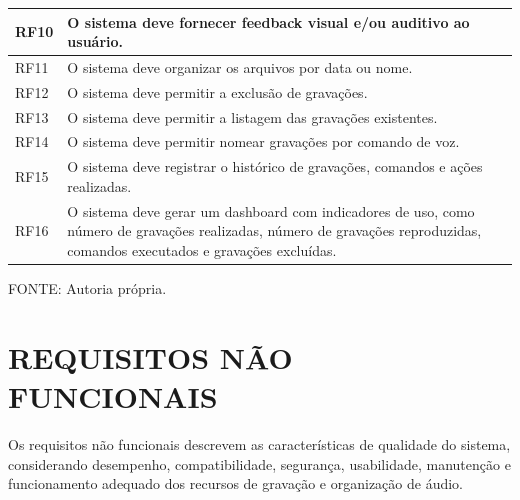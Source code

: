 \documentclass[12pt,oneside,a4paper,brazil,final]{abntex2}
\newcommand{\fontetabela}[1]{%
    \begin{center}
    {\fontsize{10}{12}\selectfont FONTE: #1}
    \end{center}
}
\begin{document}
\begin{longtable}{|p{2.3cm}|p{12cm}|}
\hline

RF10 & O sistema deve fornecer feedback visual e/ou auditivo ao usuário. \\

\hline

RF11 & O sistema deve organizar os arquivos por data ou nome. \\

\hline

RF12 & O sistema deve permitir a exclusão de gravações. \\

\hline

RF13 & O sistema deve permitir a listagem das gravações existentes. \\

\hline

RF14 & O sistema deve permitir nomear gravações por comando de voz. \\

\hline

RF15 & O sistema deve registrar o histórico de gravações, comandos e ações realizadas. \\

\hline

RF16 & O sistema deve gerar um dashboard com indicadores de uso, como número de gravações realizadas, número de gravações reproduzidas, comandos executados e gravações excluídas. \\

\hline

\end{longtable}

\fontetabela{Autoria própria.}



\section{REQUISITOS NÃO FUNCIONAIS}



Os requisitos não funcionais descrevem as características de qualidade do sistema, considerando desempenho, compatibilidade, segurança, usabilidade, manutenção e funcionamento adequado dos recursos de gravação e organização de áudio.
\end{document}
